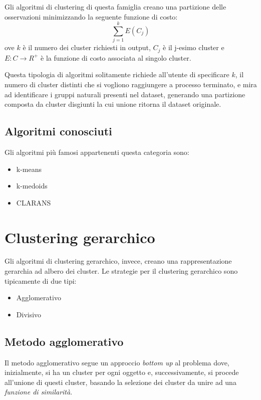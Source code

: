 	Gli algoritmi di clustering di questa famiglia creano una partizione delle osservazioni minimizzando la seguente funzione di costo:
	\begin{equation*}
	  \sum_{j=1}^{k}E(C_j)
	\end{equation*}
	ove $k$ è il numero dei cluster richiesti in output, $C_j$ è il j-esimo cluster e $E:C \rightarrow R^{+}$ è la funzione di costo associata al singolo cluster.

	Questa tipologia di algoritmi solitamente richiede all'utente di specificare $k$, il numero di cluster distinti che si vogliono raggiungere a processo terminato, e mira ad identificare i gruppi naturali presenti nel dataset, generando una partizione composta da cluster disgiunti la cui unione ritorna il dataset originale.
	
	\subsection{Algoritmi conosciuti}
		Gli algoritmi più famosi appartenenti questa categoria sono: 
		\begin{itemize}
		  	\item k-means
		  	\item k-medoids
		  	\item CLARANS
		\end{itemize}

\section{Clustering gerarchico}

	Gli algoritmi di clustering gerarchico, invece, creano una rappresentazione gerarchia ad albero dei cluster.
	Le strategie per il clustering gerarchico sono tipicamente di due tipi: 
	\begin{itemize}
		\item Agglomerativo
		\item Divisivo
	\end{itemize}
	
	\subsection{Metodo agglomerativo}
		Il metodo agglomerativo segue un approccio \emph{bottom up} al problema dove, inizialmente, si ha un cluster per ogni oggetto e, successivamente, si procede all'unione di questi cluster, basando la selezione dei cluster da unire ad una \emph{funzione di similarità}.

